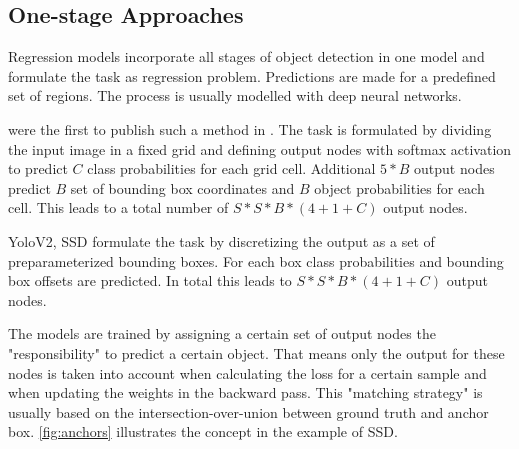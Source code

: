	
	\subsection{One-stage Approaches}
	

	Regression models incorporate all stages of object detection in one model and formulate the task as regression problem. Predictions are made for a predefined set of regions. The process is usually modelled with deep neural networks.
	
	\citeauthor{Redmon} were the first to publish such a method in \cite{Redmon}. The task is formulated by dividing the input image in a fixed grid and defining output nodes with softmax activation to predict $C$ class probabilities for each grid cell. Additional $5*B$ output nodes predict $B$ set of bounding box coordinates and $B$ object probabilities for each cell. This leads to a total number of $S*S*B*(4 + 1 + C)$ output nodes. 
	
	YoloV2, SSD  formulate the task by discretizing the output as a set of preparameterized bounding boxes. For each box class probabilities and bounding box offsets are predicted. In total this leads to $S*S*B*(4 + 1 + C)$ output nodes. 
	
	The models are trained by assigning a certain set of output nodes the "responsibility" to predict a certain object. That means only the output for these nodes is taken into account when calculating the loss for a certain sample and when updating the weights in the backward pass. This "matching strategy" is usually based on the intersection-over-union between ground truth and anchor box. \autoref{fig:anchors} illustrates the concept in the example of SSD.  
	
